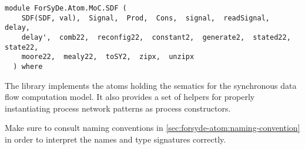 \label{module:ForSyDe.Atom.MoC.SDF}
\haddockbeginheader
{\haddockverb\begin{verbatim}
module ForSyDe.Atom.MoC.SDF (
    SDF(SDF, val),  Signal,  Prod,  Cons,  signal,  readSignal,  delay, 
    delay',  comb22,  reconfig22,  constant2,  generate2,  stated22,  state22, 
    moore22,  mealy22,  toSY2,  zipx,  unzipx
  ) where\end{verbatim}}
\haddockendheader

The  library implements the atoms holding the sematics for the
 synchronous data flow computation model. It also provides a set of
 helpers for properly instantiating process network patterns as
 process constructors.\par
\begin{mdframed}[style=reminder,frametitle=Reminder]Make sure to consult naming conventions in  \cref{sec:forsyde-atom:naming-convention} in order to interpret the names and type signatures correctly.\end{mdframed}\par

